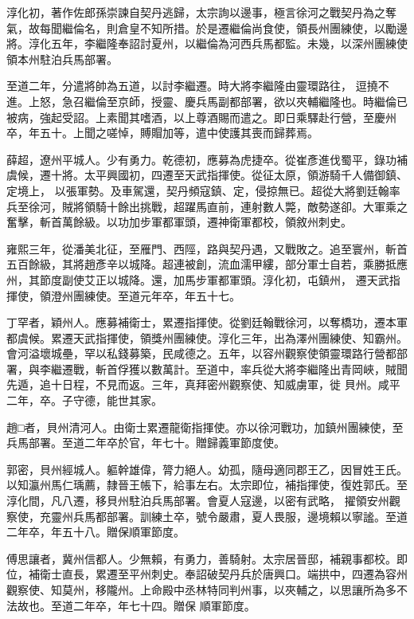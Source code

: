 \begin{pinyinscope}
 淳化初，著作佐郎孫崇諫自契丹逃歸，太宗詢以邊事，極言徐河之戰契丹為之奪氣，故每聞繼倫名，則倉皇不知所措。於是遷繼倫尚食使，領長州團練使，以勵邊將。淳化五年，李繼隆奉詔討夏州，以繼倫為河西兵馬都監。未幾，以深州團練使領本州駐泊兵馬部署。



 至道二年，分遣將帥為五道，以討李繼遷。時大將李繼隆由靈環路往，
 逗撓不進。上怒，急召繼倫至京師，授靈、慶兵馬副都部署，欲以夾輔繼隆也。時繼倫已被病，強起受詔。上素聞其嗜酒，以上尊酒賜而遣之。即日乘驛赴行營，至慶州卒，年五十。上聞之嗟悼，賻賵加等，遣中使護其喪而歸葬焉。



 薛超，遼州平城人。少有勇力。乾德初，應募為虎捷卒。從崔彥進伐蜀平，錄功補虞候，遷十將。太平興國初，四遷至天武指揮使。從征太原，領游騎千人備御鎮、定境上，
 以張軍勢。及車駕還，契丹頻寇鎮、定，侵掠無已。超從大將劉廷翰率兵至徐河，賊將領騎十餘出挑戰，超躍馬直前，連射數人斃，敵勢遂卻。大軍乘之奮擊，斬首萬餘級。以功加步軍都軍頭，遷神衛軍都校，領敘州刺史。



 雍熙三年，從潘美北征，至雁門、西陘，路與契丹遇，又戰敗之。追至寰州，斬首五百餘級，其將趙彥辛以城降。超連被創，流血濡甲縷，部分軍士自若，乘勝抵應州，其節度副使艾正以城降。還，加馬步軍都軍頭。淳化初，屯鎮州，
 遷天武指揮使，領澄州團練使。至道元年卒，年五十七。



 丁罕者，穎州人。應募補衛士，累遷指揮使。從劉廷翰戰徐河，以奪橋功，遷本軍都虞候。累遷天武指揮使，領獎州團練使。淳化三年，出為澤州團練使、知霸州。會河溢壞城壘，罕以私錢募築，民咸德之。五年，以容州觀察使領靈環路行營都部署，與李繼遷戰，斬首俘獲以數萬計。至道中，率兵從大將李繼隆出青岡峽，賊聞先遁，追十日程，不見而返。三年，真拜密州觀察使、知威虜軍，徙
 貝州。咸平二年，卒。子守德，能世其家。



 趙□者，貝州清河人。由衛士累遷龍衛指揮使。亦以徐河戰功，加鎮州團練使，至兵馬部署。至道二年卒於官，年七十。贈歸義軍節度使。



 郭密，貝州經城人。軀幹雄偉，膂力絕人。幼孤，隨母適同郡王乙，因冒姓王氏。以知瀛州馬仁瑀薦，隸晉王帳下，給事左右。太宗即位，補指揮使，復姓郭氏。至淳化間，凡八遷，移貝州駐泊兵馬部署。會夏人寇邊，以密有武略，
 擢領安州觀察使，充靈州兵馬都部署。訓練土卒，號令嚴肅，夏人畏服，邊境賴以寧謐。至道二年卒，年五十八。贈保順軍節度。



 傅思讓者，冀州信都人。少無賴，有勇力，善騎射。太宗居晉邸，補親事都校。即位，補衛士直長，累遷至平州刺史。奉詔破契丹兵於唐興口。端拱中，四遷為容州觀察使、知莫州，移隴州。上命殿中丞林特同判州事，以夾輔之，以思讓所為多不法故也。至道二年卒，年七十四。贈保
 順軍節度。




\end{pinyinscope}

